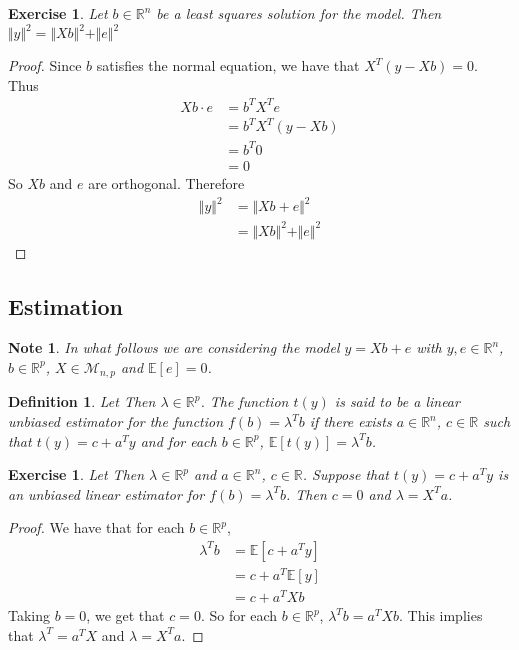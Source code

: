 \documentclass[12pt]{amsart}
\newtheorem{defn}[thm]{Definition}
\newtheorem{note}[thm]{Note}
\newtheorem{ex}[thm]{Exercise}
\newcommand{\lam}{\lambda}
\newcommand{\E}{\mathbb{E}}
\newcommand{\R}{\mathbb{R}}
\newcommand{\MM}{\mathcal{M}}
\newcommand{\n}{\Vert}
\begin{document}
\begin{ex}
Let $b \in \R^n$ be a least squares solution for the model. Then $\n y \n^2 = \n Xb \n^2 + \n e \n^2$
\end{ex}

\begin{proof}
Since $b$ satisfies the normal equation, we have that $X^T(y - Xb) = 0$. Thus 
\begin{align*}
Xb \cdot e
&= b^TX^Te \\
&= b^TX^T(y - Xb) \\
&= b^T0 \\
&=0
\end{align*}
So $Xb$ and $e$ are orthogonal. Therefore 
\begin{align*}
\n y\n^2 
&= \n Xb+ e\n^2 \\
&= \n Xb \n^2 + \n e \n^2
\end{align*}
\end{proof}

\subsection{Estimation}
\begin{note}
In what follows we are considering the model $y = Xb +e$ with $y, e \in \R^n$, $b \in \R^p$, $X \in \MM_{n,p}$ and $\E[e] = 0$.
\end{note}

\begin{defn}
Let Then $\lam \in \R^p$. The function $t(y)$ is said to be a linear unbiased estimator for the function $f(b) = \lam^T b$ if there exists $ a \in \R^n$, $c \in \R$ such that $t(y) = c+ a^Ty$ and for each $b \in \R^p$, $\E[t(y)] = \lam^T b$. 
\end{defn}

\begin{ex}
Let Then $\lam \in \R^p$ and $ a \in \R^n$, $c \in \R$. Suppose that $t(y) = c+a^Ty$ is an unbiased linear estimator for $f(b) = \lam^T b$. Then $c = 0$ and $\lam = X^Ta$. 
\end{ex}

\begin{proof}
We have that for each $b \in \R^p$, 
\begin{align*}
\lam^Tb 
&= \E[c+a^Ty] \\
&= c + a^T\E[y] \\
&= c + a^T Xb
\end{align*}
Taking $b = 0$, we get that $c =0$. So for each $b \in \R^p$, $\lam^Tb = a^TXb$. This implies that $\lam^T = a^TX$ and $\lam = X^Ta$.
\end{proof}
\end{document}
